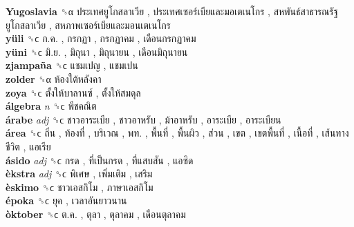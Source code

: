 \textbf{Yugoslavia} ␝α   ประเทศยูโกสลาเวีย ,  ประเทศเซอร์เบียและมอเตเนโกร ,  สหพันธ์สาธารณรัฐยูโกสลาเวีย ,  สหภาพเซอร์เบียและมอนเตเนโกร   \\
\textbf{yüli} ␝ϲ   ก.ค. ,  กรกฏา ,  กรกฏาคม ,  เดือนกรกฏาคม   \\
\textbf{yüni} ␝ϲ   มิ.ย. ,  มิถุนา ,  มิถุนายน ,  เดือนมิถุนายน   \\
\textbf{zjampaña} ␝ϲ   แชมเปญ ,  แชมเปน   \\
\textbf{zolder} ␝α   ห้องใต้หลังคา   \\
\textbf{zoya} ␝ϲ   ตั้งให้บาลานซ์ ,  ตั้งให้สมดุล   \\
\textbf{álgebra} \emph{n}  ␝ϲ   พีชคณิต   \\
\textbf{árabe} \emph{adj}  ␝ϲ   ชาวอาระเบีย ,  ชาวอาหรับ ,  ม้าอาหรับ ,  อาระเบีย ,  อาระเบียน   \\
\textbf{área} ␝ϲ   ถิ่น ,  ท้องที่ ,  บริเวณ ,  พท. ,  พื้นที่ ,  พื้นผิว ,  ส่วน ,  เขต ,  เขตพื้นที่ ,  เนื้อที่ ,  เส้นทางชีวิต ,  แอเรีย   \\
\textbf{ásido} \emph{adj}  ␝ϲ   กรด ,  ที่เป็นกรด ,  ที่แสบสัน ,  แอซิด   \\
\textbf{èkstra} \emph{adj}  ␝ϲ   พิเศษ ,  เพิ่มเติม ,  เสริม   \\
\textbf{èskimo} ␝ϲ   ชาวเอสกิโม ,  ภาษาเอสกิโม   \\
\textbf{époka} ␝ϲ   ยุค ,  เวลาอันยาวนาน   \\
\textbf{òktober} ␝ϲ   ต.ค. ,  ตุลา ,  ตุลาคม ,  เดือนตุลาคม   \\
